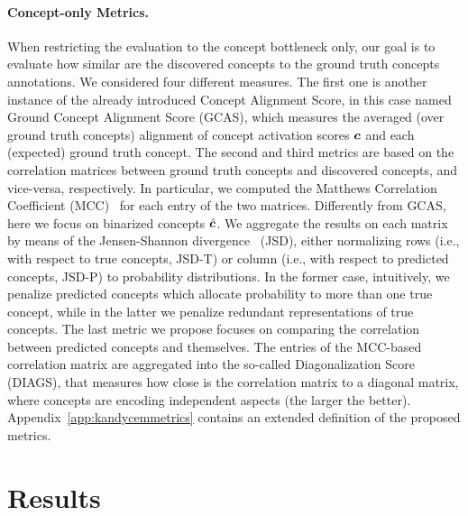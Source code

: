 \paragraph{Concept-only Metrics.} When restricting the evaluation to the concept bottleneck only, our goal is to evaluate how similar are the discovered concepts to the ground truth concepts annotations. We considered four different measures. The first one is another instance of the already introduced {\small\sc Concept Alignment Score}, in this case named {\sc\small Ground Concept Alignment Score} ({\small\sc GCAS}), which measures the averaged (over ground truth concepts) alignment of concept activation scores ${\bm{c}}$ and each (expected) ground truth concept. 
%
The second and third metrics are based on the correlation matrices between ground truth concepts and discovered concepts, and vice-versa, respectively. In particular, we computed the {\sc\small Matthews Correlation Coefficient} ({\sc\small MCC})~\cite{matthews1975comparison} for each entry of the two matrices. Differently from {\small\sc GCAS}, here we focus on binarized concepts $\hat{{\bm{c}}}$. We aggregate the results on each matrix by means of the  {\sc\small Jensen-Shannon divergence}~\cite{menendez1997jensen} ({\small\sc JSD}), either normalizing rows (i.e., with respect to true concepts, {\small\sc JSD-T}) or column (i.e., with respect to predicted concepts, {\small\sc JSD-P}) to probability distributions. %
In the former case, intuitively, we penalize predicted concepts which allocate probability to more than one true concept, while in the latter we penalize redundant representations of true concepts.
The last metric we propose focuses on comparing the correlation between predicted concepts and themselves. The entries of the {\sc\small MCC}-based correlation matrix are aggregated into the so-called {\small\sc Diagonalization Score} ({\small\sc DIAGS}), that measures how close is the correlation matrix to a diagonal matrix, where concepts are encoding independent aspects (the larger the better).
Appendix~\ref{app:kandycemmetrics} contains an extended definition of the proposed metrics.


\section{Results}

